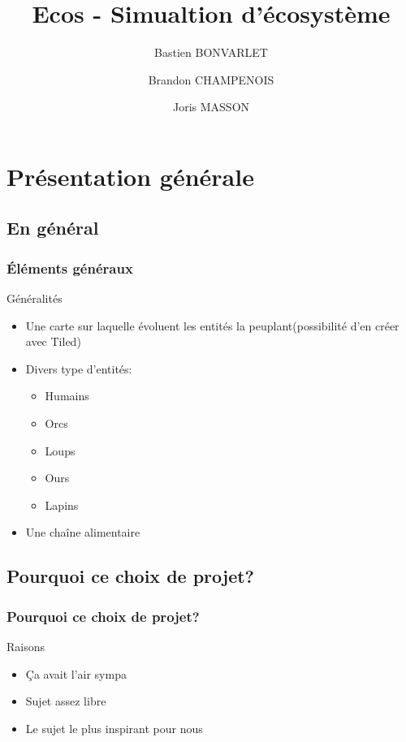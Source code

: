 \documentclass{beamer}
\title{Ecos - Simualtion d'écosystème}
\author{Bastien BONVARLET \and Brandon CHAMPENOIS \and Joris MASSON}
\institute{Université de Caen Normandie}
\begin{document}
\begin{frame}
\titlepage
\end{frame}

\begin{frame}
\tableofcontents
\end{frame}

\section{Présentation générale}
\subsection{En général}

\begin{frame} \frametitle{Éléments généraux}
	\begin{block}{Généralités}
		\begin{itemize}
			\item Une carte sur laquelle évoluent les entités la peuplant(possibilité d'en créer avec Tiled)
			\item Divers type d'entités: 									\begin{itemize}
					\item Humains
					\item Orcs
					\item Loups
					\item Ours
					\item Lapins
				\end{itemize}
			\item Une chaîne alimentaire
		\end{itemize}
	\end{block}
\end{frame}

\subsection{Pourquoi ce choix de projet?}
\begin{frame} \frametitle{Pourquoi ce choix de projet?}
	\begin{block}{Raisons}
		\begin{itemize}
			\item Ça avait l'air sympa
			\item Sujet assez libre
			\item Le sujet le plus inspirant pour nous
		\end{itemize}
	\end{block}
\end{frame}
\end{document}
